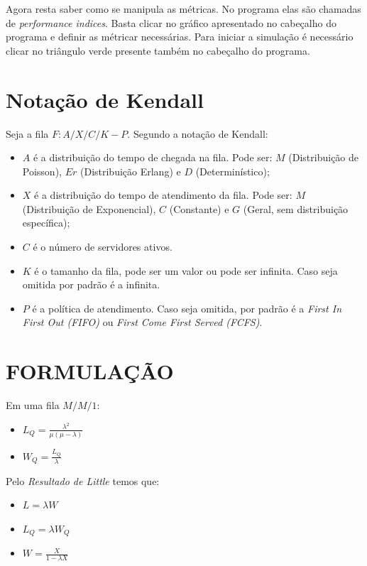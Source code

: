 \documentclass{report}
\begin{document}
Agora resta saber como se manipula as métricas. No programa elas são chamadas de \textit{performance indices}. Basta clicar no gráfico apresentado no cabeçalho do programa e definir as métricar necessárias. Para iniciar a simulação é necessário clicar no triângulo verde presente também no cabeçalho do programa.

\section{Notação de Kendall}

Seja a fila $F : A/X/C/K-P$. Segundo a notação de Kendall:
\begin{itemize}
    \item $A$ é a distribuição do tempo de chegada na fila. Pode ser: $M$ (Distribuição de Poisson), $Er$ (Distribuição Erlang) e $D$ (Determinístico);
    \item $X$ é a distribuição do tempo de atendimento da fila. Pode ser: $M$ (Distribuição de Exponencial), $C$ (Constante) e $G$ (Geral, sem distribuição específica);
    \item $C$ é o número de servidores ativos.
    \item $K$ é o tamanho da fila, pode ser um valor ou pode ser infinita. Caso seja omitida por padrão é a infinita.
    \item $P$ é a política de atendimento. Caso seja omitida, por padrão é a \textit{First In First Out (FIFO)} ou \textit{First Come First Served (FCFS)}.
\end{itemize}

\section{FORMULAÇÃO}

Em uma fila $M/M/1$:
\begin{itemize}
    \item $L_Q = \frac{\lambda ^2}{\mu(\mu-\lambda)}$ \label{eq4}
    \item $W_Q = \frac{L_Q}{\lambda}$ \label{eq5}
\end{itemize}

Pelo \textit{Resultado de Little} temos que: 
\begin{itemize}
    \item $L = \lambda W$ \label{eq1}
    \item $L_Q = \lambda W_Q$ \label{eq2}
    \item  $W = \frac{X}{1 - \lambda X}$ \label{eq3}
\end{itemize}
\end{document}
